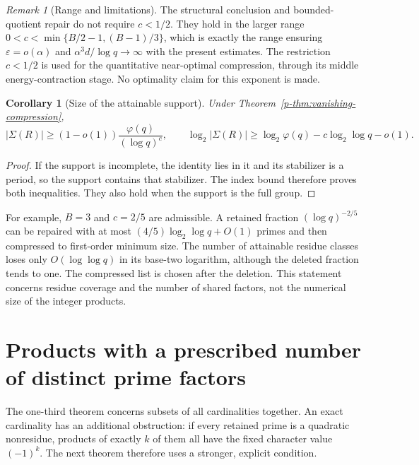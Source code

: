 \documentclass[11pt,a4paper]{article}
\newtheorem{corollary}[theorem]{Corollary}
\theoremstyle{definition}
\theoremstyle{remark}
\newtheorem{remark}[theorem]{Remark}
\begin{document}
\begin{remark}[Range and limitations]
The structural conclusion and bounded-quotient repair do not require
$c<1/2$. They hold in the larger range
$0<c<\min\{B/2-1,(B-1)/3\}$, which is exactly the range ensuring
$\varepsilon=o(\alpha)$ and $\alpha^3d/\log q\to\infty$ with the
present estimates. The restriction $c<1/2$ is used for the quantitative
near-optimal compression, through its middle energy-contraction stage.
No optimality claim for this exponent is made.
\end{remark}




\begin{corollary}[Size of the attainable support]\label{p-cor:vanishing-support}
Under Theorem~\ref{p-thm:vanishing-compression},
\[
 |\Sigma(R)|\geq(1-o(1))
 \frac{\varphi(q)}{(\log q)^c},
 \qquad
 \log_2|\Sigma(R)|
 \geq\log_2\varphi(q)-c\log_2\log q-o(1).
\]
\end{corollary}
\begin{proof}
If the support is incomplete, the identity lies in it and its stabilizer
is a period, so the support contains that stabilizer. The index bound
therefore proves both inequalities. They also hold when the support
is the full group.
\end{proof}

For example, $B=3$ and $c=2/5$ are admissible. A retained fraction
$(\log q)^{-2/5}$ can be repaired with at most
$(4/5)\log_2\log q+O(1)$ primes and then compressed to first-order
minimum size. The number of attainable residue classes loses only
$O(\log\log q)$ in its base-two logarithm, although the deleted
fraction tends to one. The compressed list is chosen after the
deletion. This statement concerns residue coverage and the number
of shared factors, not the numerical size of the integer products.



\section{Products with a prescribed number of distinct prime factors}
The one-third theorem concerns subsets of all cardinalities together.
An exact cardinality has an additional obstruction: if every retained
prime is a quadratic nonresidue, products of exactly $k$ of them all
have the fixed character value $(-1)^k$. The next theorem therefore
uses a stronger, explicit condition.
\end{document}
